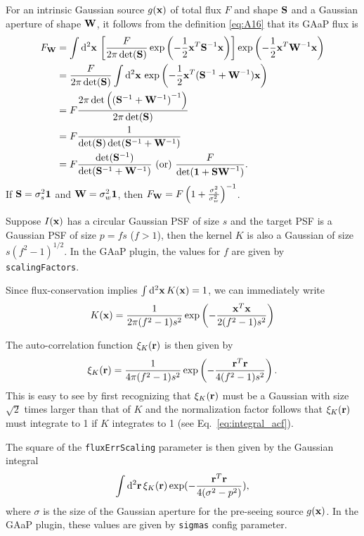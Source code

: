 \documentclass[DM,lsstdraft, authoryear,toc]{lsstdoc}
\newcommand{\rmd}{\mathrm{d}^2}
\begin{document}
For an intrinsic Gaussian source $g({\bf x})$ of total flux $F$ and shape ${\bf S}$ and a Gaussian aperture of shape ${\bf W}$,
it follows from the definition \ref{eq:A16} that its GAaP flux is
\begin{align}
  F_{\bf W} &= \int\rmd{\bf x}\, \left[\frac{F}{2\pi\det({\bf S})} \exp\left( -\frac{1}{2}{\bf x}^T{\bf S}^{-1}{\bf x} \right)\right] \exp\left( -\frac{1}{2}{\bf x}^T{\bf W}^{-1}{\bf x} \right) \\
            &= \frac{F}{2\pi\det({\bf S})}\int\rmd{\bf x}\, \exp\left(-\frac{1}{2}{\bf x}^T({\bf S}^{-1}+{\bf W}^{-1}) {\bf x}\right) \\
            &= F\frac{2\pi\det\left({({\bf S}^{-1}+{\bf W}^{-1})}^{-1}\right)}{2\pi\det({\bf S})} \\
            &= F\frac{1}{\det({\bf S})\det({\bf S}^{-1}+{\bf W}^{-1})} \\
            &= F\frac{\det({\bf S}^{-1})}{\det({\bf S}^{-1}+{\bf W}^{-1})} \text{ (or) }\frac{F}{\det({\bf 1} + {\bf S W}^{-1})}.
  \label{eq:gauss_gaap_flux}
\end{align}
If ${\bf S} = \sigma_s^2{\bf 1}$ and ${\bf W} = \sigma_w^2{\bf 1}$, then $F_{\bf W} = F\left(1+\frac{\sigma_s^2}{\sigma_w^2}\right)^{-1}$.

Suppose $I({\bf x})$ has a circular Gaussian PSF of size $s$ and the target PSF is a Gaussian PSF of size $p = fs$ ($f>1$), then the kernel $K$ is also a Gaussian of size $s(f^2-1)^{1/2}$.
In the GAaP plugin, the values for $f$ are given by \texttt{scalingFactors}.

Since flux-conservation implies $\int\rmd{\bf x}\, K({\bf x}) = 1$, we can immediately write
\begin{equation}
  K({\bf x}) = \frac{1}{2\pi (f^2-1)s^2} \exp\left(-\frac{{\bf x}^T{\bf x}}{2(f^2-1)s^2}\right)
\end{equation}

The auto-correlation function $\xi_K({\bf r})$ is then given by
\begin{equation}
  \xi_K({\bf r}) = \frac{1}{4\pi(f^2-1)s^2}\exp\left(-\frac{{\bf r}^T{\bf r}}{4(f^2-1)s^2}\right).
\end{equation}
This is easy to see by first recognizing that $\xi_K({\bf r})$ must be a Gaussian with size $\sqrt{2}$ times larger than that of $K$ and the normalization factor follows that $\xi_K({\bf r})$ must integrate to 1 if $K$ integrates to 1 (see Eq.~\ref{eq:integral_acf}).

The square of the \texttt{fluxErrScaling} parameter is then given by the Gaussian integral
\begin{equation*}
  \int\rmd{\bf r}\,\xi_K({\bf r})\exp(-\frac{{\bf r}^T{\bf r}}{4(\sigma^2-p^2)}),
\end{equation*}
where $\sigma$ is the size of the Gaussian aperture for the pre-seeing source $g({\bf x})$. In the GAaP plugin, these values are given by \texttt{sigmas} config parameter.
\end{document}
